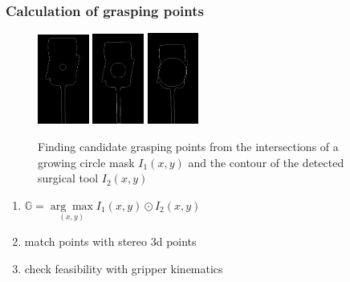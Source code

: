 \begin{frame}
\frametitle{Calculation of grasping points}
\begin{center}
\begin{figure}[!htb]
\centering
\includegraphics[width=0.15\textwidth]{../images/grasp_points_1.png}
\includegraphics[width=0.15\textwidth]{../images/grasp_points_2.png}
\includegraphics[width=0.15\textwidth]{../images/grasp_points_3.png}\\
\caption{Finding candidate grasping points from the intersections of a growing circle mask $I_1(x,y)$ and the contour of the detected surgical tool $I_2(x,y)$}
\end{figure}

\begin{enumerate}
\item $\mathbb{G} = \underset{(x,y)}{\arg\max} I_1(x,y) \odot I_2(x,y)$
\item match points with stereo 3d points
\item check feasibility with gripper kinematics
\end{enumerate}

\end{center}
\end{frame}
